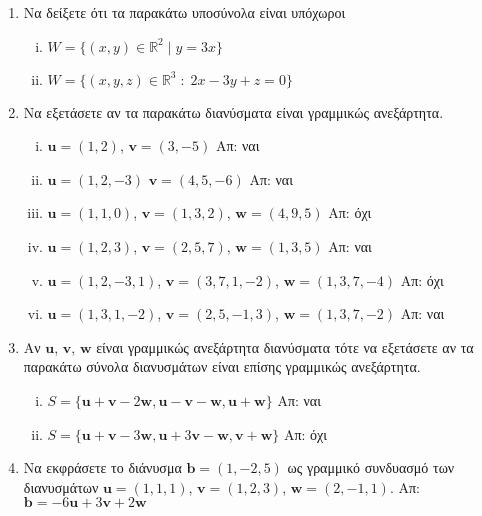 \documentclass[a4paper,table]{report}
\begin{document}
\begin{enumerate}
  \item Να δείξετε ότι τα παρακάτω υποσύνολα είναι υπόχωροι
    \begin{enumerate}[(i)]
      \item $ W = \{ (x,y) \in \mathbb{R}^{2} \mid y = 3x \} $ 
      \item $ W = \{(x,y,z)\in \mathbb{R}^{3} \; : \; 2x-3y+z=0 \} $
    \end{enumerate}

  \item\label{ask:lineks} Να εξετάσετε αν τα παρακάτω διανύσματα είναι γραμμικώς 
    ανεξάρτητα.
    \begin{enumerate}[(i)]
      \item $ \mathbf{u} = (1,2) $, $ \mathbf{v} = (3,-5) $ \hfill Απ: ναι
      \item $ \mathbf{u} = (1,2,-3) $ $ \mathbf{v} = (4,5,-6) $ \hfill Απ: ναι
      \item $ \mathbf{u} = (1,1,0)$, $ \mathbf{v} = (1,3,2)$, $ \mathbf{w} = (4,9,5) $ 
        \hfill Απ: όχι 
      \item $ \mathbf{u} = (1,2,3)$, $ \mathbf{v} = (2,5,7)$, $ \mathbf{w} = (1,3,5) $ 
        \hfill Απ: ναι 
      \item $ \mathbf{u} = (1,2,-3,1) $, $ \mathbf{v} = (3,7,1,-2) $, $ \mathbf{w} =
        (1,3,7,-4) $ \hfill Απ: όχι
      \item $ \mathbf{u} = (1,3,1,-2) $, $ \mathbf{v} = (2,5,-1,3) $, $ \mathbf{w} =
        (1,3,7,-2) $ \hfill Απ: ναι
    \end{enumerate}

  \item Αν $ \mathbf{u} $, $ \mathbf{v} $, $ \mathbf{w} $ είναι γραμμικώς 
    ανεξάρτητα διανύσματα τότε να εξετάσετε αν τα παρακάτω σύνολα διανυσμάτων 
    είναι επίσης γραμμικώς ανεξάρτητα.
    \begin{enumerate}[(i)]
      \item $ S = \{ \mathbf{u} + \mathbf{v} - 2 \mathbf{w}, \mathbf{u} - \mathbf{v} -
        \mathbf{w}, \mathbf{u} + \mathbf{w} \} $ \hfill Απ: ναι 
      \item $ S = \{ \mathbf{u} + \mathbf{v} - 3 \mathbf{w}, \mathbf{u} + 3 \mathbf{v} -
        \mathbf{w}, \mathbf{v} + \mathbf{w}\}  $ \hfill Απ: όχι 
    \end{enumerate}

  \item\label{ask:eksart} Να εκφράσετε το διάνυσμα $ \mathbf{b} = (1,-2,5) $ ως γραμμικό 
    συνδυασμό των διανυσμάτων $ \mathbf{u} = (1,1,1)$, $ \mathbf{v} = (1,2,3)$, 
    $ \mathbf{w} = (2,-1,1) $.
    \hfill Απ: $ \mathbf{b} = -6 \mathbf{u} + 3 \mathbf{v} +2 \mathbf{w} $ 	


\end{enumerate}
\end{document}
